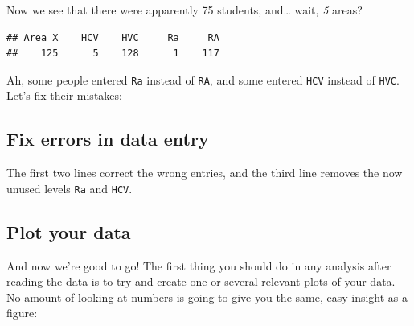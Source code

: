\documentclass[
]{book}
\newenvironment{Shaded}{\begin{snugshade}}{\end{snugshade}}
\newcommand{\KeywordTok}[1]{\textcolor[rgb]{0.13,0.29,0.53}{\textbf{#1}}}
\newcommand{\NormalTok}[1]{#1}
\newcommand{\OperatorTok}[1]{\textcolor[rgb]{0.81,0.36,0.00}{\textbf{#1}}}
\newcommand{\StringTok}[1]{\textcolor[rgb]{0.31,0.60,0.02}{#1}}
\begin{document}
Now we see that there were apparently 75 students, and\ldots{} wait, \emph{5} areas?

\begin{Shaded}
\end{Shaded}

\begin{verbatim}
## Area X    HCV    HVC     Ra     RA 
##    125      5    128      1    117
\end{verbatim}

Ah, some people entered \texttt{Ra} instead of \texttt{RA}, and some entered \texttt{HCV} instead of \texttt{HVC}. Let's fix their mistakes:

\hypertarget{fix-errors-in-data-entry}{%
\subsection{Fix errors in data entry}\label{fix-errors-in-data-entry}}

\begin{Shaded}
\end{Shaded}

The first two lines correct the wrong entries, and the third line removes the now unused levels \texttt{Ra} and \texttt{HCV}.

\hypertarget{plot-your-data}{%
\subsection{Plot your data}\label{plot-your-data}}

And now we're good to go! The first thing you should do in any analysis after reading the data is to try and create one or several relevant plots of your data. No amount of looking at numbers is going to give you the same, easy insight as a figure:
\end{document}
